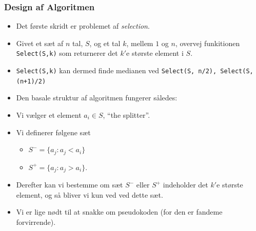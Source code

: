 \documentclass{beamer}
\begin{document}
\begin{frame}[allowframebreaks]
  \frametitle{Design af Algoritmen}
  
  \begin{itemize}
  \item Det første skridt er problemet af \textit{selection}. 
  \item Givet et sæt af $n$ tal, $S$, og et tal $k$, mellem $1$ og $n$, overvej funkitionen \texttt{Select(S,k)} som returnerer det $k'$e største element i $S$.
  \item \texttt{Select(S,k)} kan dermed finde medianen ved \texttt{Select(S, n/2), Select(S, (n+1)/2)}
  \item Den basale struktur af algoritmen fungerer således:
  \item Vi vælger et element $a_{i} \in S$, ``the splitter''.
  \item Vi definerer følgene sæt
    \begin{itemize}
    \item $S^{-} = \{a_{j} : a_{j} < a_{i}\}$
    \item $S^{+} = \{a_{j} : a_{j} > a_{i}\}$. 
    \end{itemize}
    \item Derefter kan vi bestemme om sæt $S^{-}$ eller $S^{+}$ indeholder det $k'$e største element, og så bliver vi kun ved ved dette sæt.
    \item Vi er lige nødt til at snakke om pseudokoden (for den er fandeme forvirrende).
  \end{itemize}

\end{frame}
\end{document}
